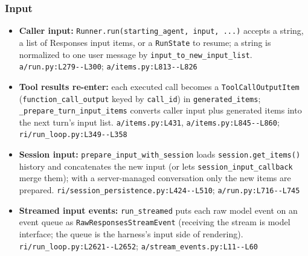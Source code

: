 \subsubsection*{Input}
\begin{itemize}
\item \textbf{Caller input:} \texttt{Runner.\allowbreak{}run(\allowbreak{}starting\_\allowbreak{}agent, input, .\allowbreak{}.\allowbreak{}.\allowbreak{})} accepts a string, a list of Responses input items, or a \texttt{RunState} to resume; a string is normalized to one user message by \texttt{input\_\allowbreak{}to\_\allowbreak{}new\_\allowbreak{}input\_\allowbreak{}list}. \texttt{a/\allowbreak{}run.\allowbreak{}py:\allowbreak{}L279-\allowbreak{}-\allowbreak{}L300}; \texttt{a/\allowbreak{}items.\allowbreak{}py:\allowbreak{}L813-\allowbreak{}-\allowbreak{}L826}
\item \textbf{Tool results re-enter:} each executed call becomes a \texttt{ToolCallOutputItem} (\texttt{function\_\allowbreak{}call\_\allowbreak{}output} keyed by \texttt{call\_\allowbreak{}id}) in \texttt{generated\_\allowbreak{}items}; \texttt{\_\allowbreak{}prepare\_\allowbreak{}turn\_\allowbreak{}input\_\allowbreak{}items} converts caller input plus generated items into the next turn's input list. \texttt{a/\allowbreak{}items.\allowbreak{}py:\allowbreak{}L431}, \texttt{a/\allowbreak{}items.\allowbreak{}py:\allowbreak{}L845-\allowbreak{}-\allowbreak{}L860}; \texttt{ri/\allowbreak{}run\_\allowbreak{}loop.\allowbreak{}py:\allowbreak{}L349-\allowbreak{}-\allowbreak{}L358}
\item \textbf{Session input:} \texttt{prepare\_\allowbreak{}input\_\allowbreak{}with\_\allowbreak{}session} loads \texttt{session.\allowbreak{}get\_\allowbreak{}items(\allowbreak{})} history and concatenates the new input (or lets \texttt{session\_\allowbreak{}input\_\allowbreak{}callback} merge them); with a server-managed conversation only the new items are prepared. \texttt{ri/\allowbreak{}session\_\allowbreak{}persistence.\allowbreak{}py:\allowbreak{}L424-\allowbreak{}-\allowbreak{}L510}; \texttt{a/\allowbreak{}run.\allowbreak{}py:\allowbreak{}L716-\allowbreak{}-\allowbreak{}L745}
\item \textbf{Streamed input events:} \texttt{run\_\allowbreak{}streamed} puts each raw model event on an event queue as \texttt{RawResponsesStreamEvent} (receiving the stream is model interface; the queue is the harness's input side of rendering). \texttt{ri/\allowbreak{}run\_\allowbreak{}loop.\allowbreak{}py:\allowbreak{}L2621-\allowbreak{}-\allowbreak{}L2652}; \texttt{a/\allowbreak{}stream\_\allowbreak{}events.\allowbreak{}py:\allowbreak{}L11-\allowbreak{}-\allowbreak{}L60}
\end{itemize}


